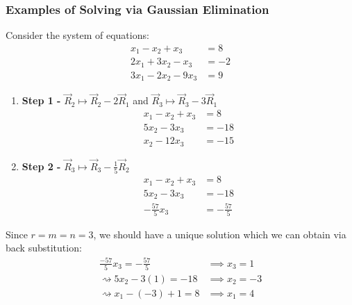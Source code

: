 \documentclass[../main.tex]{subfiles}
\begin{document}
\subsubsection{Examples of Solving via Gaussian Elimination}
\begin{example}
  Consider the system of equations:
  \begin{align*}
    x_1 - x_2 + x_3 &= 8 \\
    2x_1 + 3x_2 - x_3 &= -2 \\
    3x_1 - 2x_2 - 9x_3 &= 9
  \end{align*}
  \begin{enumerate}
    \item \textbf{Step 1 -} $\vec{R}_2 \mapsto \vec{R}_2 - 2\vec{R}_1$ and $\vec{R}_3 \mapsto \vec{R}_3 - 3\vec{R}_1$
    \begin{align*}
      x_1 - x_2 + x_3 &= 8 \\
      5x_2 - 3x_3 &= -18 \\
      x_2 - 12x_3 &= -15
    \end{align*}
    \item \textbf{Step 2 -} $\vec{R}_3 \mapsto \vec{R}_3 - \frac{1}{5}\vec{R}_2$
    \begin{align*}
      x_1 - x_2 + x_3 &= 8 \\
      5x_2 - 3x_3 &= -18 \\
      -\frac{57}{5}x_3 &= -\frac{57}{5}
    \end{align*}
  \end{enumerate}
  Since $r = m = n = 3$, we should have a unique solution which we can obtain via back substitution:
  \begin{align*}
    \frac{-57}{5}x_3 = -\frac{57}{5} &\implies x_3 = 1 \\
    \rightsquigarrow 5x_2 - 3(1) = -18 &\implies x_2 = -3 \\
    \rightsquigarrow x_1 - (-3)+ 1 = 8 &\implies x_1 = 4
  \end{align*}
\end{example}
\end{document}
